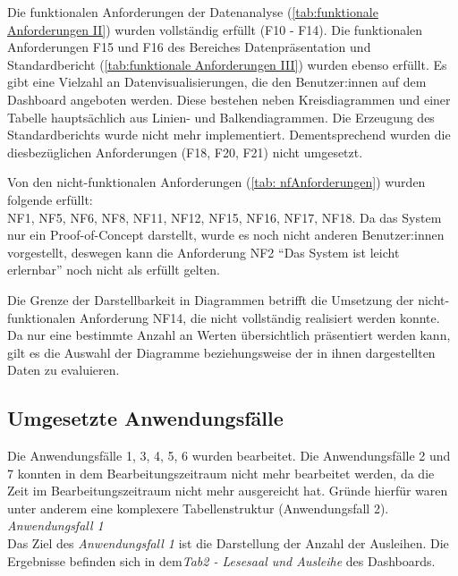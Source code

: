 Die funktionalen Anforderungen der Datenanalyse (\autoref{tab:funktionale Anforderungen II}) wurden vollständig erfüllt (F10 - F14).
Die funktionalen Anforderungen F15 und F16 des Bereiches Datenpräsentation und Standardbericht (\autoref{tab:funktionale Anforderungen III}) 
wurden ebenso erfüllt. Es gibt eine Vielzahl an Datenvisualisierungen, die den Benutzer:innen auf dem Dashboard angeboten werden. 
Diese bestehen neben Kreisdiagrammen und einer Tabelle hauptsächlich aus Linien- und Balkendiagrammen.
Die Erzeugung des Standardberichts wurde nicht mehr implementiert. Dementsprechend wurden die diesbezüglichen
Anforderungen (F18, F20, F21) nicht umgesetzt. 

Von den nicht-funktionalen Anforderungen (\autoref{tab: nfAnforderungen}) wurden folgende erfüllt:\\
NF1, NF5, NF6, NF8, NF11, NF12, NF15, NF16, NF17, NF18. 
Da das System nur ein Proof-of-Concept darstellt, wurde es noch nicht anderen
Benutzer:innen vorgestellt, deswegen kann die Anforderung NF2 \enquote{Das System ist leicht erlernbar} noch nicht als erfüllt gelten.

Die Grenze der Darstellbarkeit in Diagrammen betrifft die Umsetzung der nicht-funktionalen Anforderung NF14, die nicht vollständig
realisiert werden konnte. Da nur eine bestimmte Anzahl an Werten übersichtlich präsentiert werden kann, gilt es die Auswahl der Diagramme
beziehungsweise der in ihnen dargestellten Daten zu evaluieren. 



\subsection{Umgesetzte Anwendungsfälle}
Die Anwendungsfälle 1, 3, 4, 5, 6 wurden bearbeitet.
Die Anwendungsfälle 2 und 7 konnten in dem Bearbeitungszeitraum nicht mehr bearbeitet werden, 
da die Zeit im Bearbeitungszeitraum nicht mehr ausgereicht hat. Gründe hierfür waren unter anderem eine komplexere Tabellenstruktur (Anwendungsfall 2).\\

\clearpage
\noindent
\textit{Anwendungsfall 1}\\
Das Ziel des \textit{Anwendungsfall 1} ist die Darstellung der Anzahl der Ausleihen.
Die Ergebnisse befinden sich in dem\textit{Tab2 - Lesesaal und Ausleihe} des Dashboards.

